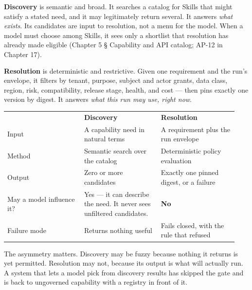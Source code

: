 
\textbf{Discovery} is semantic and broad. It searches a catalog for Skills that might satisfy a stated need, and it may legitimately return several. It answers \emph{what exists}. Its candidates are input to resolution, not a menu for the model. When a model must choose among Skills, it sees only a shortlist that resolution has already made eligible (Chapter 5 § Capability and API catalog; AP-12 in Chapter 17).\par

\textbf{Resolution} is deterministic and restrictive. Given one requirement and the run's envelope, it filters by tenant, purpose, subject and actor grants, data class, region, risk, compatibility, release stage, health, and cost — then pins exactly one version by digest. It answers \emph{what this run may use, right now}.\par

\BookTableStart
\small
\begin{tabular}{@{}Y{0.3133\linewidth}Y{0.3133\linewidth}Y{0.3133\linewidth}@{}}
\color{white}\bfseries  & \color{white}\bfseries Discovery & \color{white}\bfseries Resolution \\
Input & A capability need in natural terms & A requirement plus the run envelope \\
Method & Semantic search over the catalog & Deterministic policy evaluation \\
Output & Zero or more candidates & Exactly one pinned digest, or a failure \\
May a model influence it? & Yes — it can describe the need. It never sees unfiltered candidates. & \textbf{No} \\
Failure mode & Returns nothing useful & Fails closed, with the rule that refused \\
\end{tabular}
\BookTableEnd

The asymmetry matters. Discovery may be fuzzy because nothing it returns is yet permitted. Resolution may not, because its output is what will actually run. A system that lets a model pick from discovery results has skipped the gate and is back to ungoverned capability with a registry in front of it.\par

